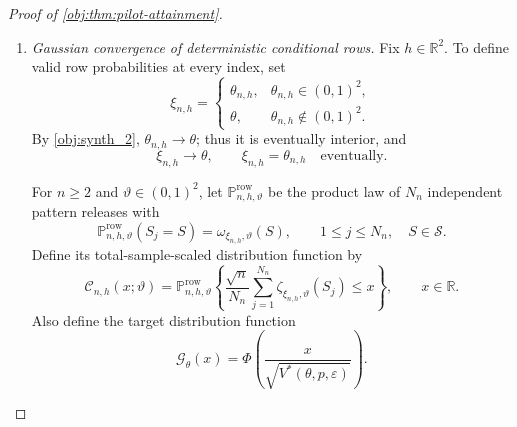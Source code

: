 \begin{proof}[Proof of \cref{obj:thm:pilot-attainment}]
\begin{enumerate}
To establish continuity of the optimized value, define
\[
K=[-\overline t,\overline t],
\qquad
\mathcal E_\xi(u)=\max_{\alpha\in\mathcal A_\varepsilon}
F_\xi(\alpha,u),
\quad \xi\in(0,1)^2,\ u\in\mathbb R.
\]
The saddle inequalities give
\[
\mathcal E_\xi(t_\xi)=J_\xi,
\qquad
\mathcal E_\xi(u)\ge
F_\xi(\alpha_\xi,u)\ge J_\xi.
\]
Since \(t_\xi\in K\),
\[
J^*(\xi,p,\varepsilon)=\min_{u\in K}\mathcal E_\xi(u).
\]
The feasible set is nonempty, closed, and contained in \([0,1]^{14}\), hence compact. The objective is jointly continuous on interior parameters, feasible weights, and \(K\). The elementary bounds for maxima and minima give
\[
\left|J^*(\xi,p,\varepsilon)-J^*(\theta,p,\varepsilon)\right|
\le
\sup_{\substack{\alpha\in\mathcal A_\varepsilon\\u\in K}}
|F_\xi(\alpha,u)-F_\theta(\alpha,u)|
\longrightarrow0
\quad(\xi\to\theta).
\]
The convergence follows from joint continuity on a compact parameter neighborhood times \(\mathcal A_\varepsilon\times K\). Positivity of \(J^*\) then gives
\[
V^*(\xi,p,\varepsilon)\longrightarrow V^*(\theta,p,\varepsilon).
\]
Combining this with the displayed variance-error bound proves
\[
\sigma^2(\xi,\vartheta)\longrightarrow V^*(\theta,p,\varepsilon)
\qquad
\text{as }(\xi,\vartheta)\to(\theta,\theta)
\text{ through interior pairs}.
\]

\item \emph{Gaussian convergence of deterministic conditional rows.}
Fix \(h\in\mathbb R^2\). To define valid row probabilities at every index, set
\[
\xi_{n,h}=
\begin{cases}
\theta_{n,h},&\theta_{n,h}\in(0,1)^2,\\
\theta,&\theta_{n,h}\notin(0,1)^2.
\end{cases}
\]
By \cref{obj:synth_2}, \(\theta_{n,h}\to\theta\); thus it is eventually interior, and
\[
\xi_{n,h}\to\theta,
\qquad
\xi_{n,h}=\theta_{n,h}\quad\text{eventually}.
\]

For \(n\ge2\) and \(\vartheta\in(0,1)^2\), let
\(\mathbb P^{\mathrm{row}}_{n,h,\vartheta}\) be the product law of \(N_n\) independent pattern releases with
\[
\mathbb P^{\mathrm{row}}_{n,h,\vartheta}(S_j=S)
=\omega_{\xi_{n,h},\vartheta}(S),
\qquad 1\le j\le N_n,\quad S\in\mathcal S.
\]
Define its total-sample-scaled distribution function by
\[
\mathcal C_{n,h}(x;\vartheta)
=
\mathbb P^{\mathrm{row}}_{n,h,\vartheta}
\left\{
\frac{\sqrt n}{N_n}
\sum_{j=1}^{N_n}\zeta_{\xi_{n,h},\vartheta}(S_j)\le x
\right\},
\qquad x\in\mathbb R.
\]
Also define the target distribution function
\[
\mathcal G_\theta(x)
=\Phi\left(\frac{x}{\sqrt{V^*(\theta,p,\varepsilon)}}\right).
\]


\end{enumerate}
\end{proof}
